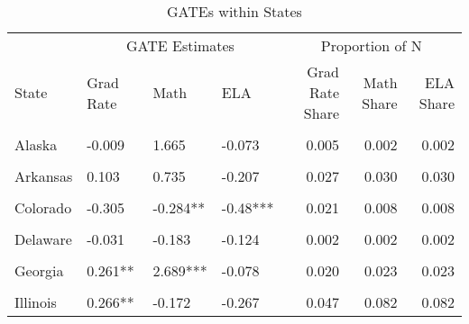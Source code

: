\begin{table}[!h]
\centering
\caption{\label{tab:state_gates_combined}GATEs within States}
\centering
\begin{tabular}[t]{llllrrr}
\toprule
\multicolumn{1}{c}{ } & \multicolumn{3}{c}{GATE Estimates} & \multicolumn{3}{c}{Proportion of N} \\
\cmidrule(l{3pt}r{3pt}){2-4} \cmidrule(l{3pt}r{3pt}){5-7}
State & Grad Rate & Math & ELA & Grad Rate Share & Math Share & ELA Share\\
\midrule
\cellcolor{gray!10}{Alabama} & \cellcolor{gray!10}{0.149} & \cellcolor{gray!10}{NA} & \cellcolor{gray!10}{NA} & \cellcolor{gray!10}{0.011} & \cellcolor{gray!10}{NA} & \cellcolor{gray!10}{NA}\\
Alaska & -0.009 & 1.665 & -0.073 & 0.005 & 0.002 & 0.002\\
\cellcolor{gray!10}{Arizona} & \cellcolor{gray!10}{0.016} & \cellcolor{gray!10}{0.171} & \cellcolor{gray!10}{0.161} & \cellcolor{gray!10}{0.010} & \cellcolor{gray!10}{0.017} & \cellcolor{gray!10}{0.017}\\
Arkansas & 0.103 & 0.735 & -0.207 & 0.027 & 0.030 & 0.030\\
\cellcolor{gray!10}{California} & \cellcolor{gray!10}{0.031} & \cellcolor{gray!10}{0.078} & \cellcolor{gray!10}{0.041} & \cellcolor{gray!10}{0.040} & \cellcolor{gray!10}{0.069} & \cellcolor{gray!10}{0.069}\\
Colorado & -0.305 & -0.284** & -0.48*** & 0.021 & 0.008 & 0.008\\
\cellcolor{gray!10}{Connecticut} & \cellcolor{gray!10}{0.116} & \cellcolor{gray!10}{0.009} & \cellcolor{gray!10}{-0.073} & \cellcolor{gray!10}{0.013} & \cellcolor{gray!10}{0.017} & \cellcolor{gray!10}{0.017}\\
Delaware & -0.031 & -0.183 & -0.124 & 0.002 & 0.002 & 0.002\\
\cellcolor{gray!10}{Florida} & \cellcolor{gray!10}{0.352***} & \cellcolor{gray!10}{-0.231} & \cellcolor{gray!10}{0.034} & \cellcolor{gray!10}{0.008} & \cellcolor{gray!10}{0.007} & \cellcolor{gray!10}{0.007}\\
Georgia & 0.261** & 2.689*** & -0.078 & 0.020 & 0.023 & 0.023\\
\cellcolor{gray!10}{Idaho} & \cellcolor{gray!10}{0.035} & \cellcolor{gray!10}{-0.031} & \cellcolor{gray!10}{0.232} & \cellcolor{gray!10}{0.012} & \cellcolor{gray!10}{0.011} & \cellcolor{gray!10}{0.011}\\
Illinois & 0.266** & -0.172 & -0.267 & 0.047 & 0.082 & 0.082\\

\end{tabular}
\end{table}
